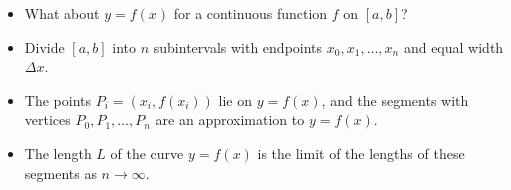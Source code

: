 \begin{frame}
\begin{itemize}
\item  What about $y = f(x)$ for a continuous function $f$ on $[a, b]$?
\item<2->  Divide $[a,b]$ into $n$ subintervals with endpoints $x_0, x_1, \ldots , x_n$ and equal width $\Delta x$.
\item<3->  The points $P_i = (x_i, f(x_i))$ lie on $y = f(x)$, and the segments with vertices $P_0, P_1, \ldots , P_n$ are an approximation to $y = f(x)$.
\item<4->  The length $L$ of the curve $y = f(x)$ is the limit of the lengths of these segments as $n\rightarrow \infty$.
\end{itemize}
\begin{columns}[c]
\begin{center}
\ %
%
\end{center}
\end{columns}
\end{frame}
